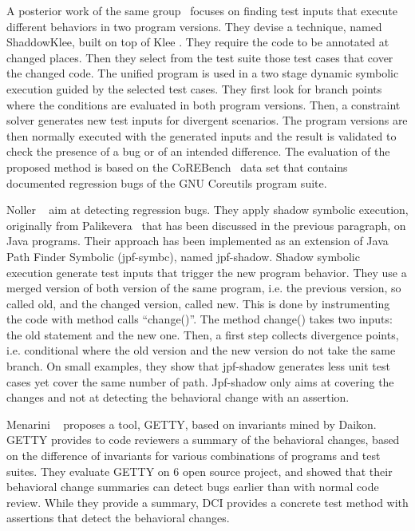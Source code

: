 A posterior work of the same group~\cite{palikareva2016shadow,Kuchta:2018:SSE:3276753.3208952} focuses on finding test inputs that execute different behaviors in two program versions. 
They devise a technique, named ShaddowKlee, built on top of Klee \cite{klee}. 
They require the code to be annotated at changed places. 
Then they select from the test suite those test cases that cover the changed code. The unified program is used in a two stage dynamic symbolic execution guided by the selected test cases.
They first look for branch points where the conditions are evaluated in both program versions.
Then, a constraint solver generates new test inputs for divergent scenarios. The program versions are then normally executed with the generated inputs and the result is validated to check the presence of a bug or of an intended difference.
The evaluation of the proposed method is based on the CoREBench~\cite{bohme2014corebench} data set that contains documented regression bugs of the GNU Coreutils program suite. 


Noller \etal~\cite{jpfshadow} aim at detecting regression bugs. 
They apply shadow symbolic execution, originally from Palikevera~\cite{dse,palikareva2016shadow} that has been discussed in the previous paragraph, on Java programs. 
Their approach has been implemented as an extension of Java Path Finder Symbolic (jpf-symbc)\cite{jpfsymb}, named jpf-shadow. 
Shadow symbolic execution generate test inputs that trigger the new program behavior. 
They use a merged version of both version of the same program, i.e. the previous version, so called old, and the changed version, called new.
This is done by instrumenting the code with method calls ``change()''.
The method change() takes two inputs: the old statement and the new one.
Then, a first step collects divergence points, i.e. conditional where the old version and the new version do not take the same branch.
On small examples, they show that jpf-shadow generates less unit test cases yet cover the same number of path. 
Jpf-shadow only aims at covering the changes and not at detecting the behavioral change with an assertion.

Menarini \etal~\cite{semantics:code:review} proposes a tool, GETTY, based on invariants mined by Daikon.
GETTY provides to code reviewers a summary of the behavioral changes, based on the difference of invariants for various combinations of programs and test suites.
They evaluate GETTY on 6 open source project, and showed that their behavioral change summaries can detect bugs earlier than with normal code review.
While they provide a summary, DCI provides a concrete test method with assertions that detect the behavioral changes. 

